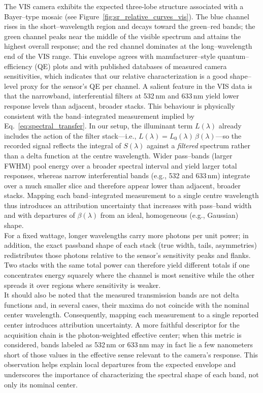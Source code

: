 \noindent
The VIS camera exhibits the expected three-lobe structure associated with a Bayer–type mosaic \cite{Bayer1976ColorArray,Gunturk2005Demosaicking} (see Figure~\ref{fig:sr_relative_curves_vis}). The blue channel rises in the short–wavelength region and decays toward the green–red bands; the green channel peaks near the middle of the visible spectrum and attains the highest overall response; and the red channel dominates at the long–wavelength end of the VIS range. This envelope agrees with manufacturer–style quantum–efficiency (QE) plots \cite{AlliedVision_Alvium1800U500_DataSheet} and with published databases of measured camera sensitivities, which indicates that our relative characterization is a good shape–level proxy for the sensor’s QE per channel. A salient feature in the VIS data is that the narrowband, interferential filters at 532\,nm and 633\,nm yield lower response levels than adjacent, broader stacks. This behaviour is physically consistent with the band–integrated measurement implied by Eq.~\eqref{eq:spectral_transfer}. In our setup, the illuminant term \(L(\lambda)\) already includes the action of the filter stack—i.e., \(L(\lambda)=L_{0}(\lambda)\,\beta(\lambda)\)—so the recorded signal reflects the integral of \(S(\lambda)\) against a \emph{filtered} spectrum rather than a delta function at the centre wavelength. Wider pass–bands (larger FWHM) pool energy over a broader spectral interval and yield larger total responses, whereas narrow interferential bands (e.g., 532 and 633\,nm) integrate over a much smaller slice and therefore appear lower than adjacent, broader stacks. Mapping each band–integrated measurement to a single centre wavelength thus introduces an attribution uncertainty that increases with pass–band width and with departures of \(\beta(\lambda)\) from an ideal, homogeneous (e.g., Gaussian) shape.\\

\noindent
For a fixed wattage, longer wavelengths carry more photons per unit power; in addition, the exact passband shape of each stack (true width, tails, asymmetries) redistributes those photons relative to the sensor’s sensitivity peaks and flanks. Two stacks with the same total power can therefore yield different totals if one concentrates energy squarely where the channel is most sensitive while the other spreads it over regions where sensitivity is weaker.\\



\noindent It should also be noted that the measured transmission bands are not delta functions and, in several cases, their maxima do not coincide with the nominal center wavelength. Consequently, mapping each measurement to a single reported center introduces attribution uncertainty. A more faithful descriptor for the acquisition chain is the photon-weighted effective center; when this metric is considered, bands labeled as 532\,nm or 633\,nm may in fact lie a few nanometers short of those values in the effective sense relevant to the camera’s response. This observation helps explain local departures from the expected envelope and underscores the importance of characterizing the spectral shape of each band, not only its nominal center.\\

